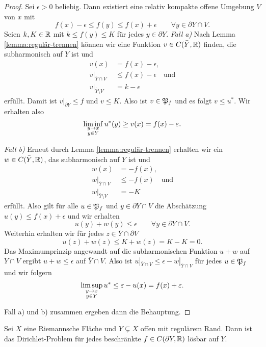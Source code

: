 \begin{proof}
  Sei $\epsilon > 0$ beliebig. Dann existiert eine relativ kompakte offene
  Umgebung $V$ von $x$ mit
  \[
  f(x) - \epsilon \leq f(y) \leq f(x) + \epsilon \qquad \forall y
  \in \partial Y \cap V.
  \]
  Seien $k, K \in \mathbb{R}$ mit $k \leq f(y) \leq K$ für jedes $y
  \in \partial Y$.
  \emph{Fall a)} Nach Lemma \ref{lemma:regulär-trennen} können wir eine
  Funktion $v \in C(\bar Y, \mathbb{R})$ finden, die subharmonisch auf $Y$ ist und
  \begin{align*}
    v(x) & = f(x) - \epsilon, \\
    v|_{\bar Y \cap V} & \leq f(x) - \epsilon \quad \text{und} \\
    v|_{\bar Y \setminus V} & = k - \epsilon
  \end{align*}
  erfüllt. Damit ist $v|_{\partial Y} \leq f$ und $v \leq K$. Also ist $v \in
  \mathfrak{P}_f$ und es folgt $v \leq u^\ast$. Wir erhalten also
  \[
  \liminf_{\substack{y \rightarrow x\\y \in Y}} u^\ast(y) \geq v(x) = f(x) - \varepsilon.
  \]
  
  \emph{Fall b)} Erneut durch Lemma \ref{lemma:regulär-trennen} erhalten
  wir ein $w \in C(\bar Y, \mathbb{R})$, das subharmonisch auf $Y$ ist und
  \begin{align*}
    w(x) & = - f(x), \\
    w|_{\bar Y \cap V} & \leq -f(x) \quad \text{und} \\
    w|_{\bar Y \setminus V}  & = -K
  \end{align*}
  erfüllt. Also gilt für alle $u \in \mathfrak{P}_f$ und $y \in \partial Y \cap
  V$ die Abschätzung
  $u(y) \leq f(x) + \epsilon$ und wir erhalten
  \[
  u(y) + w(y) \leq \epsilon \qquad \forall y \in \partial Y \cap V.
  \]
  Weiterhin erhalten wir für jedes $z \in \bar Y \cap \partial V$
  \[
  u(z) + w(z) \leq K + w(z) = K - K  = 0.
  \]
  Das Maximumprinzip angewandt auf die subharmonischen Funktion $u+w$
  auf $Y \cap V$ ergibt $u + w \leq \epsilon $ auf $\bar Y \cap
  V$. Also ist $u|_{\bar Y \cap V} \leq \epsilon - w|_{\bar Y \cap V}$
  für jedes $u \in \mathfrak{P}_f$ und wir folgern
  \[
  \limsup_{\substack{y \rightarrow x\\y \in Y}}u^\ast \leq \varepsilon - u(x) = f(x)
  + \varepsilon.
  \]
  
  Fall a) und b) zusammen ergeben dann die Behauptung.
\end{proof}

\begin{thm}
  \label{thm:dirichlet}
  Sei $X$ eine Riemannsche Fläche und  $Y \subsetneq X$ offen mit
  regulärem Rand. Dann ist das Dirichlet-Problem für jedes
  beschränkte $f \in C(\partial Y, \mathbb{R})$ lösbar auf $Y$.
\end{thm}

